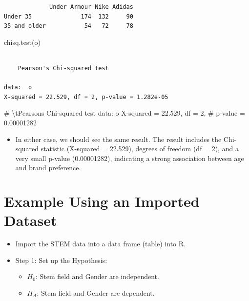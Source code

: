 \documentclass[
  letterpaper,
  DIV=11,
  numbers=noendperiod]{scrreprt}
\newenvironment{Shaded}{\begin{snugshade}}{\end{snugshade}}
\newcommand{\CommentTok}[1]{\textcolor[rgb]{0.37,0.37,0.37}{#1}}
\newcommand{\FunctionTok}[1]{\textcolor[rgb]{0.28,0.35,0.67}{#1}}
\newcommand{\NormalTok}[1]{\textcolor[rgb]{0.00,0.23,0.31}{#1}}
\providecommand{\tightlist}{%
  \setlength{\itemsep}{0pt}\setlength{\parskip}{0pt}}\usepackage{longtable,booktabs,array}
\begin{document}
\begin{verbatim}
             Under Armour Nike Adidas
Under 35              174  132     90
35 and older           54   72     78
\end{verbatim}

\begin{Shaded}
\begin{Highlighting}[]
\FunctionTok{chisq.test}\NormalTok{(o)}
\end{Highlighting}
\end{Shaded}

\begin{verbatim}

    Pearson's Chi-squared test

data:  o
X-squared = 22.529, df = 2, p-value = 1.282e-05
\end{verbatim}

\begin{Shaded}
\begin{Highlighting}[]
\CommentTok{\# \textbackslash{}tPearson\textquotesingle{}s Chi{-}squared test data: o X{-}squared = 22.529, df = 2,}
\CommentTok{\# p{-}value = 0.00001282}
\end{Highlighting}
\end{Shaded}

\begin{itemize}
\tightlist
\item
  In either case, we should see the same result. The result includes the
  Chi-squared statistic (X-squared = 22.529), degrees of freedom (df =
  2), and a very small p-value (0.00001282), indicating a strong
  association between age and brand preference.
\end{itemize}

\section{Example Using an Imported
Dataset}\label{example-using-an-imported-dataset}

\begin{itemize}
\tightlist
\item
  Import the STEM data into a data frame (table) into R.
\item
  Step 1: Set up the Hypothesis:

  \begin{itemize}
  \tightlist
  \item
    \(H_0\): Stem field and Gender are independent.
  \item
    \(H_A\): Stem field and Gender are dependent.
  \end{itemize}
\end{itemize}
\end{document}
